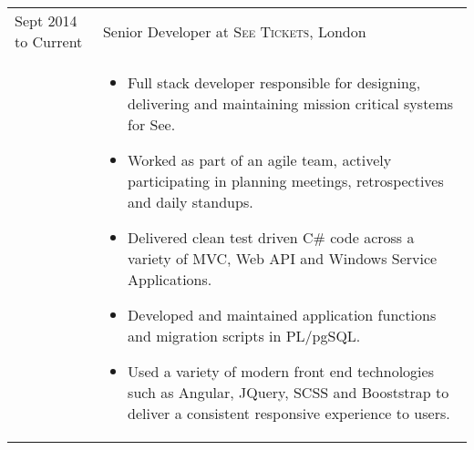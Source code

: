 \documentclass[a4paper,10pt]{article} %
\begin{document}
\begin{tabular}{ L{2cm} | L{11cm}}	



Sept 2014 to Current & Senior Developer at \textsc{See Tickets}, London \\

 
 

 
&\MPtrue	   
\begin{itemize}[leftmargin=*]
 
 
 
		\item Full stack developer responsible for designing, delivering and maintaining mission critical systems for See. 

		\item Worked as part of an agile team, actively participating in planning meetings, retrospectives and daily standups. 

		\item Delivered clean test driven C\# code across a variety of MVC, Web API and Windows Service Applications. 

		\item Developed and maintained application functions and migration scripts in PL/pgSQL.

		\item Used a variety of modern front end technologies such as Angular, JQuery, SCSS and Booststrap to deliver a consistent responsive experience to users. 
		

	\end{itemize} \\
   

\end{tabular}
\end{document}
